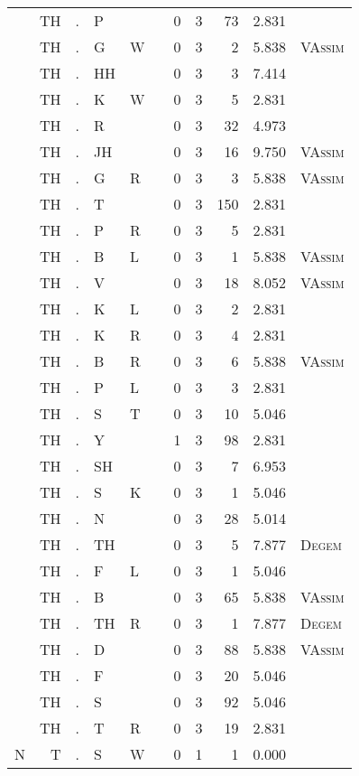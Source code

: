 \begin{longtable}{r@{ } r@{ } c@{ } l@{ } l@{ } l@{ } r r r r l }
 & TH & . & P &  &  & 0 & 3 & 73 & 2.831 &  \\
 & TH & . & G & W &  & 0 & 3 & 2 & 5.838 & \textsc{VAssim} \\
 & TH & . & HH &  &  & 0 & 3 & 3 & 7.414 &  \\
 & TH & . & K & W &  & 0 & 3 & 5 & 2.831 &  \\
 & TH & . & R &  &  & 0 & 3 & 32 & 4.973 &  \\
 & TH & . & JH &  &  & 0 & 3 & 16 & 9.750 & \textsc{VAssim} \\
 & TH & . & G & R &  & 0 & 3 & 3 & 5.838 & \textsc{VAssim} \\
 & TH & . & T &  &  & 0 & 3 & 150 & 2.831 &  \\
 & TH & . & P & R &  & 0 & 3 & 5 & 2.831 &  \\
 & TH & . & B & L &  & 0 & 3 & 1 & 5.838 & \textsc{VAssim} \\
 & TH & . & V &  &  & 0 & 3 & 18 & 8.052 & \textsc{VAssim} \\
 & TH & . & K & L &  & 0 & 3 & 2 & 2.831 &  \\
 & TH & . & K & R &  & 0 & 3 & 4 & 2.831 &  \\
 & TH & . & B & R &  & 0 & 3 & 6 & 5.838 & \textsc{VAssim} \\
 & TH & . & P & L &  & 0 & 3 & 3 & 2.831 &  \\
 & TH & . & S & T &  & 0 & 3 & 10 & 5.046 &  \\
 & TH & . & Y &  &  & 1 & 3 & 98 & 2.831 &  \\
 & TH & . & SH &  &  & 0 & 3 & 7 & 6.953 &  \\
 & TH & . & S & K &  & 0 & 3 & 1 & 5.046 &  \\
 & TH & . & N &  &  & 0 & 3 & 28 & 5.014 &  \\
 & TH & . & TH &  &  & 0 & 3 & 5 & 7.877 & \textsc{Degem} \\
 & TH & . & F & L &  & 0 & 3 & 1 & 5.046 &  \\
 & TH & . & B &  &  & 0 & 3 & 65 & 5.838 & \textsc{VAssim} \\
 & TH & . & TH & R &  & 0 & 3 & 1 & 7.877 & \textsc{Degem} \\
 & TH & . & D &  &  & 0 & 3 & 88 & 5.838 & \textsc{VAssim} \\
 & TH & . & F &  &  & 0 & 3 & 20 & 5.046 &  \\
 & TH & . & S &  &  & 0 & 3 & 92 & 5.046 &  \\
 & TH & . & T & R &  & 0 & 3 & 19 & 2.831 &  \\
N & T & . & S & W &  & 0 & 1 & 1 & 0.000 &  \\

\end{longtable}
